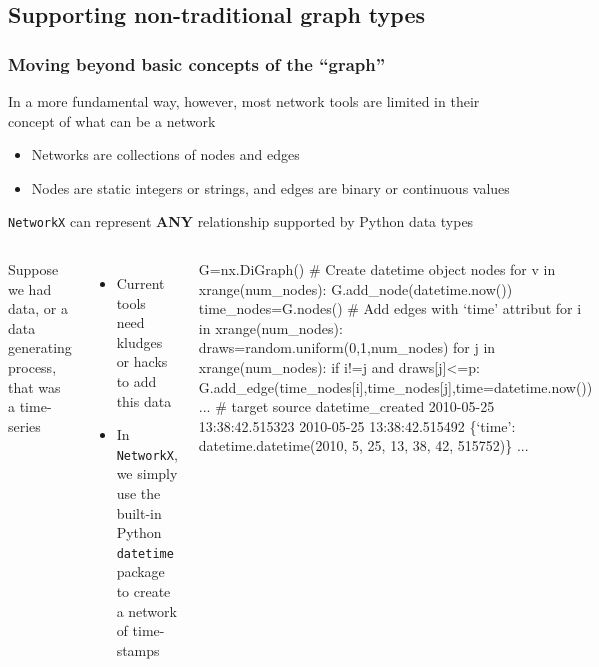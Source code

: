 \documentclass[xcolor=dvipsnames, 9pt]{beamer}
\newenvironment{code}{\begin{semiverbatim} \begin{footnotesize}}
{\end{footnotesize}\end{semiverbatim}}
\begin{document}

\subsection{Supporting non-traditional graph types} %
\label{sub:supporting_non_traditional_graph_types}

\begin{frame}[fragile]
    \frametitle{Moving beyond basic concepts of the ``graph''}
    In a more fundamental way, however, most network tools are limited in their concept of what can be a network
    \begin{itemize}
        \item Networks are collections of nodes and edges
        \item Nodes are static integers or strings, and edges are binary or continuous values
    \end{itemize}
    \texttt{NetworkX} can represent \textbf{ANY} relationship supported by Python data types
    \vspace{2mm}
    \begin{columns}
        \small{Suppose we had data, or a data generating process, that was a time-series
        \begin{itemize}
            \item Current tools need kludges or hacks to add this data
            \item In \texttt{NetworkX}, we simply use the built-in Python \texttt{datetime} package to create a network of time-stamps
        \end{itemize}}
        \begin{block}{}
            \begin{code}
\tiny{G=nx.DiGraph()
\alert<2>{# Create datetime object nodes
for v in xrange(num_nodes):
    G.add_node(datetime.now())
time_nodes=G.nodes()}
\alert<3>{# Add edges with `time' attribut
for i in xrange(num_nodes):
    draws=random.uniform(0,1,num_nodes)
    for j in xrange(num_nodes):
        if i!=j and draws[j]<=p:
            G.add_edge(time_nodes[i],time_nodes[j],time=datetime.now())
...}
\alert<4>{# target source datetime_created
2010-05-25 13:38:42.515323 2010-05-25 13:38:42.515492 
    \{`time': datetime.datetime(2010, 5, 25, 13, 38, 42, 515752)\}
...}}
                \end{code}
            \end{block}
    \end{columns}
\end{frame}
\end{document}
